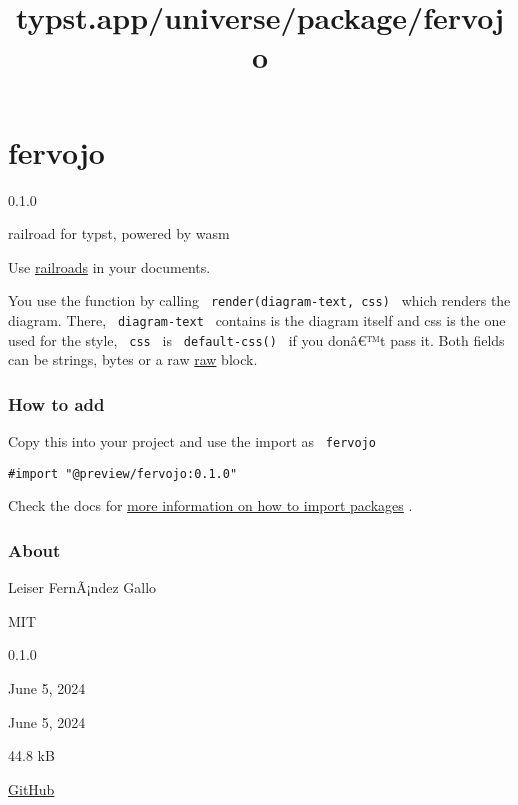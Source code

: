 \title{typst.app/universe/package/fervojo}

\label{banner}
\section{fervojo}\label{fervojo}

{ 0.1.0 }

railroad for typst, powered by wasm

\label{readme}
Use \href{https://github.com/lukaslueg/railroad_dsl}{railroads} in your
documents.

You use the function by calling \texttt{\ render(diagram-text,\ css)\ }
which renders the diagram. There, \texttt{\ diagram-text\ } contains is
the diagram itself and css is the one used for the style,
\texttt{\ css\ } is \texttt{\ default-css()\ } if you donâ€™t pass it.
Both fields can be strings, bytes or a raw
\href{https://typst.app/docs/reference/text/raw/}{raw} block.

\subsubsection{How to add}\label{how-to-add}

Copy this into your project and use the import as \texttt{\ fervojo\ }

\begin{verbatim}
#import "@preview/fervojo:0.1.0"
\end{verbatim}



Check the docs for
\href{https://typst.app/docs/reference/scripting/\#packages}{more
information on how to import packages} .

\subsubsection{About}\label{about}

\begin{description}
\tightlist
\item[Author :]
Leiser FernÃ¡ndez Gallo
\item[License:]
MIT
\item[Current version:]
0.1.0
\item[Last updated:]
June 5, 2024
\item[First released:]
June 5, 2024
\item[Archive size:]
44.8 kB
\href{https://packages.typst.org/preview/fervojo-0.1.0.tar.gz}{\pandocbounded{}}
\item[Repository:]
\href{https://github.com/leiserfg/fervojo}{GitHub}
\end{description}

